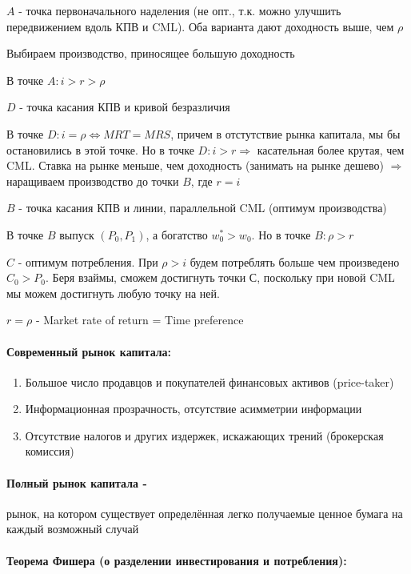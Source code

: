 \documentclass[a4paper,12pt]{article} %
\begin{document}
$ A $
- точка первоначального наделения (не опт., т.к. можно улучшить передвижением вдоль КПВ и CML). Оба варианта дают доходность выше, чем $ \rho $ 

Выбираем производство, приносящее большую доходность

В точке $ A: i > r > \rho $ 

$ D $ -  точка касания КПВ и кривой безразличия

В точке $ D: i = \rho \Leftrightarrow MRT = MRS $, причем в отстутствие рынка капитала, мы бы остановились в этой точке. Но в точке $D: i > r \Rightarrow $ касательная более крутая, чем CML. Ставка на рынке меньше, чем доходность (занимать на рынке дешево) $ \Rightarrow  $  наращиваем производство до точки $ B $, где $r = i $

$ B $
 - точка касания КПВ и линии, параллельной CML (оптимум производства)
 
В точке  $ B $ выпуск $ (P_0,P_1) $,  а богатство $w_0^* > w_0  $. Но в точке $ B: \rho > r $

$ C $ - оптимум потребления. При $ \rho > i $ будем потреблять больше чем произведено $ C_0 > P_0 $. 
Беря взаймы, сможем достигнуть точки $ С $, поскольку при новой CML мы можем достигнуть любую точку на ней. 

$ r = \rho $ -  Market rate of return  = Time preference 




\paragraph{Современный рынок капитала:}

\begin{enumerate}
	\item Большое число продавцов и покупателей финансовых активов (price-taker)
	\item Информационная прозрачность, отсутствие асимметрии информации
	\item Отсутствие налогов и других издержек, искажающих трений (брокерская комиссия)
\end{enumerate}  
  
  \paragraph{Полный рынок капитала - }
  рынок, на котором существует определённая легко получаемые ценное бумага на каждый возможный случай 
  
 
\paragraph{Теорема Фишера (о разделении инвестирования и потребления):}
\end{document}

